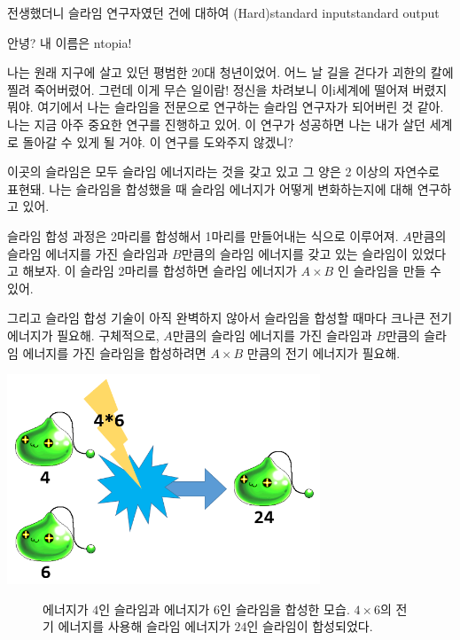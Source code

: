 \begin{problem}{전생했더니 슬라임 연구자였던 건에 대하여 (Hard)}{standard input}{standard output}

안녕? 내 이름은 ntopia!

나는 원래 지구에 살고 있던 평범한 20대 청년이었어. 어느 날 길을 걷다가 괴한의 칼에 찔려
죽어버렸어. 그런데 이게 무슨 일이람! 정신을 차려보니 이i세계에 떨어져 버렸지 뭐야.
여기에서 나는 슬라임을 전문으로 연구하는 슬라임 연구자가 되어버린 것 같아.
나는 지금 아주 중요한 연구를 진행하고 있어. 이 연구가 성공하면 나는 내가 살던 세계로
돌아갈 수 있게 될 거야. 이 연구를 도와주지 않겠니?

이곳의 슬라임은 모두 슬라임 에너지라는 것을 갖고 있고 그 양은 2 이상의 자연수로 표현돼.
나는 슬라임을 합성했을 때 슬라임 에너지가 어떻게 변화하는지에 대해 연구하고 있어.

슬라임 합성 과정은 2마리를 합성해서 1마리를 만들어내는 식으로 이루어져.
$A$만큼의 슬라임 에너지를 가진 슬라임과 $B$만큼의 슬라임 에너지를 갖고 있는
슬라임이 있었다고 해보자. 이 슬라임 2마리를 합성하면
슬라임 에너지가 $A \times B$ 인 슬라임을 만들 수 있어.

그리고 슬라임 합성 기술이 아직 완벽하지 않아서 슬라임을 합성할 때마다
크나큰 전기 에너지가 필요해. 구체적으로,
$A$만큼의 슬라임 에너지를 가진 슬라임과 $B$만큼의 슬라임 에너지를 가진 슬라임을
합성하려면 $A \times B$ 만큼의 전기 에너지가 필요해.

\begin{center}
  \includegraphics[width=0.7\textwidth]{slime_compose.png}
  \begin{figure}[!h]
  \captionsetup{labelformat=empty,justification=centering}
  \caption{에너지가 $4$인 슬라임과 에너지가 $6$인 슬라임을 합성한 모습. $4\times6$의 전기 에너지를 사용해 슬라임 에너지가 $24$인 슬라임이 합성되었다.}
  \end{figure}
\end{center}


\end{problem}
